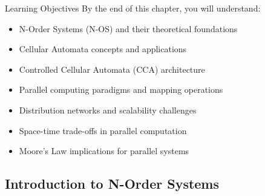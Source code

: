 
\begin{frame}{Learning Objectives}
By the end of this chapter, you will understand:
\begin{itemize}
\item N-Order Systems (N-OS) and their theoretical foundations
\item Cellular Automata concepts and applications
\item Controlled Cellular Automata (CCA) architecture
\item Parallel computing paradigms and mapping operations
\item Distribution networks and scalability challenges
\item Space-time trade-offs in parallel computation
\item Moore's Law implications for parallel systems
\end{itemize}
\end{frame}

\subsection{Introduction to N-Order Systems}

